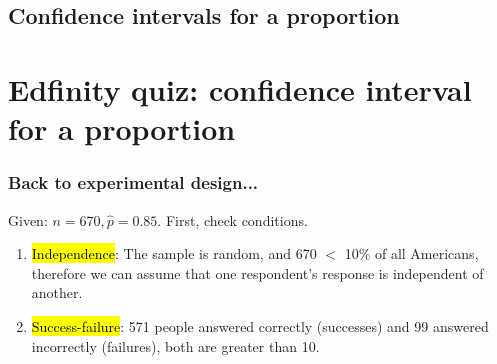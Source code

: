 \documentclass[slidestop,compress,mathserif]{beamer}
\begin{document}
%
%
%
%
%

\subsection{Confidence intervals for a proportion}


\section{Edfinity quiz: confidence interval for a proportion} 


\begin{frame}
\frametitle{Back to experimental design...}


\pause
Given: $n = 670, \hat{p} = 0.85$. First, check conditions.

\pause
\begin{enumerate}[1.]
\item \hl{Independence}: The sample is random, and 670 $<$ 10\% of all Americans, therefore we can assume that one respondent's response is independent of another.
\pause
\item \hl{Success-failure}: 571 people answered correctly (successes) and 99 answered incorrectly (failures), both are greater than 10.
\end{enumerate}

\end{frame}
\end{document}
